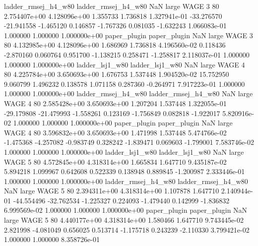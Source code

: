 ladder_rmsej_h4_w80 ladder_rmsej_h4_w80                   NaN      large     WAGE                 3 80 2.754407e+00   4.128096e+00      1.355733       1.736818  1.327941e-01    -33.276570    -21.941558    -1.465120       0.146857 -1.767326   0.081035    -1.632243   1.066083e-01            1.000000        1.000000        1.000000e+00
       paper_plugin        paper_plugin                   NaN      large     WAGE                 3 80 4.132985e+00   4.128096e+00      1.686969       1.736818  4.196560e-02      0.118436     -2.870160     0.060764       0.951700 -1.138215   0.258471    -1.258817   2.118037e-01            1.000000        1.000000        1.000000e+00
    ladder_lsj1_w80     ladder_lsj1_w80                   NaN      large     WAGE                 4 80 4.225784e+00   3.650693e+00      1.676753       1.537448  1.904520e-02     15.752950      9.060799     1.496232       0.138578  1.071158   0.287360    -0.264971   7.917223e-01            1.000000        1.000000        1.000000e+00
ladder_rmsej_h4_w80 ladder_rmsej_h4_w80                   NaN      large     WAGE                 4 80 2.585428e+00   3.650693e+00      1.207204       1.537448  1.322055e-01    -29.179808    -21.479993    -1.558261       0.123169 -1.756849   0.082818    -1.922017   5.820916e-02            1.000000        1.000000        1.000000e+00
       paper_plugin        paper_plugin                   NaN      large     WAGE                 4 80 3.596832e+00   3.650693e+00      1.471998       1.537448  5.474766e-02     -1.475368     -4.257082    -0.983749       0.328242 -1.839471   0.069603    -1.799001   7.583746e-02            1.000000        1.000000        1.000000e+00
    ladder_lsj1_w80     ladder_lsj1_w80                   NaN      large     WAGE                 5 80 4.572845e+00   4.318314e+00      1.665834       1.647710  9.435187e-02      5.894218      1.099967     0.642608       0.522339  0.138948   0.889845    -1.200987   2.333446e-01            1.000000        1.000000        1.000000e+00
ladder_rmsej_h4_w80 ladder_rmsej_h4_w80                   NaN      large     WAGE                 5 80 2.394311e+00   4.318314e+00      1.107878       1.647710  2.140944e-01    -44.554496    -32.762534    -1.225327       0.224093 -1.479440   0.142999    -1.836832   6.999569e-02            1.000000        1.000000        1.000000e+00
       paper_plugin        paper_plugin                   NaN      large     WAGE                 5 80 4.440177e+00   4.318314e+00      1.580466       1.647710  9.743445e-02      2.821998     -4.081049     0.656025       0.513714 -1.175718   0.243239    -2.110330   3.799421e-02            1.000000        1.000000        8.358726e-01
